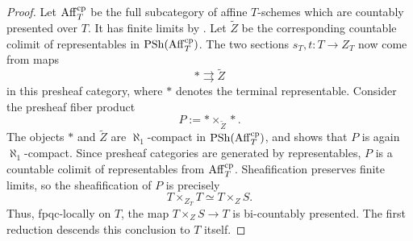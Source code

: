 \documentclass[11pt]{book}
\begin{document}
\begin{proof}
		Let $\operatorname{Aff}_T^{\mathrm{cp}}$ be the full subcategory of affine
		$T$-schemes which are countably presented over $T$. It has finite
		limits by . Let
		$\widetilde Z$ be the corresponding countable colimit of representables
		in $\operatorname{PSh}(\operatorname{Aff}_T^{\mathrm{cp}})$. The two sections $s_T,t\colon T \to
		Z_T$ now come from maps
		\[
			\ast \rightrightarrows \widetilde Z
		\]
		in this presheaf category, where $\ast$ denotes the terminal
		representable. Consider the presheaf fiber product
		\[
			P := \ast \times_{\widetilde Z} \ast.
		\]
		The objects $\ast$ and $\widetilde Z$ are $\aleph_1$-compact in
		$\operatorname{PSh}(\operatorname{Aff}_T^{\mathrm{cp}})$, and
		 shows that $P$ is
		again $\aleph_1$-compact. Since presheaf categories are generated by
		representables, $P$ is a countable colimit of representables from
		$\operatorname{Aff}_T^{\mathrm{cp}}$. Sheafification preserves finite limits, so the
		sheafification of $P$ is precisely
		\[
			T \times_{Z_T} T \simeq T \times_Z S.
		\]
		Thus, fpqc-locally on $T$, the map $T \times_Z S \to T$ is
		bi-countably presented. The first reduction descends this conclusion
		to $T$ itself.
	\end{proof}
\end{document}
